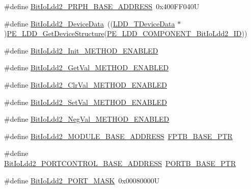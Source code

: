 \begin{DoxyCompactItemize}
\item 
\#define \hyperlink{group___bit_io_ldd2__module_gae2c93f84ea59b52ac4e0b1eac3a8b47f}{Bit\+Io\+Ldd2\+\_\+\+P\+R\+P\+H\+\_\+\+B\+A\+S\+E\+\_\+\+A\+D\+D\+R\+E\+SS}~0x400\+F\+F040U
\item 
\#define \hyperlink{group___bit_io_ldd2__module_gaf2ef02c6b9a8451493963d7ae23c7574}{Bit\+Io\+Ldd2\+\_\+\+Device\+Data}~((\hyperlink{group___p_e___types__module_gac5cf1362f1f0e3a2ce71b1bf2276d091}{L\+D\+D\+\_\+\+T\+Device\+Data} $\ast$)\hyperlink{group___p_e___types__module_gaa1c23d559daef5bcd3327ca83fb56f5a}{P\+E\+\_\+\+L\+D\+D\+\_\+\+Get\+Device\+Structure}(\hyperlink{group___p_e___types__module_gaa087b2342b35bd80243ddc0f181f0215}{P\+E\+\_\+\+L\+D\+D\+\_\+\+C\+O\+M\+P\+O\+N\+E\+N\+T\+\_\+\+Bit\+Io\+Ldd2\+\_\+\+ID}))
\item 
\#define \hyperlink{group___bit_io_ldd2__module_gaff3f9c9cb38ac7244b796333afef0c82}{Bit\+Io\+Ldd2\+\_\+\+Init\+\_\+\+M\+E\+T\+H\+O\+D\+\_\+\+E\+N\+A\+B\+L\+ED}
\item 
\#define \hyperlink{group___bit_io_ldd2__module_ga5c2fdb6732a439c3cc2dc51ed3c9f593}{Bit\+Io\+Ldd2\+\_\+\+Get\+Val\+\_\+\+M\+E\+T\+H\+O\+D\+\_\+\+E\+N\+A\+B\+L\+ED}
\item 
\#define \hyperlink{group___bit_io_ldd2__module_ga2cde86d856f0965fb132127390551a0d}{Bit\+Io\+Ldd2\+\_\+\+Clr\+Val\+\_\+\+M\+E\+T\+H\+O\+D\+\_\+\+E\+N\+A\+B\+L\+ED}
\item 
\#define \hyperlink{group___bit_io_ldd2__module_ga47665ce2390398cfa5381c9174d38ec0}{Bit\+Io\+Ldd2\+\_\+\+Set\+Val\+\_\+\+M\+E\+T\+H\+O\+D\+\_\+\+E\+N\+A\+B\+L\+ED}
\item 
\#define \hyperlink{group___bit_io_ldd2__module_ga11c6377079039d271fd19a91a04eb35d}{Bit\+Io\+Ldd2\+\_\+\+Neg\+Val\+\_\+\+M\+E\+T\+H\+O\+D\+\_\+\+E\+N\+A\+B\+L\+ED}
\item 
\#define \hyperlink{group___bit_io_ldd2__module_gae34d8d80fda789aa770f3068a4c7dfc7}{Bit\+Io\+Ldd2\+\_\+\+M\+O\+D\+U\+L\+E\+\_\+\+B\+A\+S\+E\+\_\+\+A\+D\+D\+R\+E\+SS}~\hyperlink{group___backward___compatibility___symbols_ga725ec21a43213bffe0aa484f7406bcf5}{F\+P\+T\+B\+\_\+\+B\+A\+S\+E\+\_\+\+P\+TR}
\item 
\#define \hyperlink{group___bit_io_ldd2__module_ga4194c86be52355349ef034fd3322dabf}{Bit\+Io\+Ldd2\+\_\+\+P\+O\+R\+T\+C\+O\+N\+T\+R\+O\+L\+\_\+\+B\+A\+S\+E\+\_\+\+A\+D\+D\+R\+E\+SS}~\hyperlink{group___p_o_r_t___peripheral_ga585b4782d1ceb44492289af0019480f9}{P\+O\+R\+T\+B\+\_\+\+B\+A\+S\+E\+\_\+\+P\+TR}
\item 
\#define \hyperlink{group___bit_io_ldd2__module_gad48bd98192a32c10a7458ae8991abcb7}{Bit\+Io\+Ldd2\+\_\+\+P\+O\+R\+T\+\_\+\+M\+A\+SK}~0x00080000U
\end{DoxyCompactItemize}
